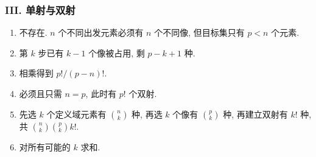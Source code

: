 \documentclass[usesamecnt, thmcnt=section, lang=cn, newtx, 10pt, scheme=chinese]{elegantbook}
\begin{document}
\subsubsection*{III. 单射与双射}
\begin{enumerate}[label=\textbf{\arabic*.}, start=11]
  \item 不存在. $n$ 个不同出发元素必须有 $n$ 个不同像, 但目标集只有 $p<n$ 个元素.
  \item 第 $k$ 步已有 $k-1$ 个像被占用, 剩 $p-k+1$ 种.
  \item 相乘得到 $p!/(p-n)!$.
  \item 必须且只需 $n=p$, 此时有 $p!$ 个双射.
  \item 先选 $k$ 个定义域元素有 $\binom nk$ 种, 再选 $k$ 个像有 $\binom pk$ 种, 再建立双射有 $k!$ 种, 共 $\binom nk\binom pk k!$.
  \item 对所有可能的 $k$ 求和.
\end{enumerate}
\end{document}

